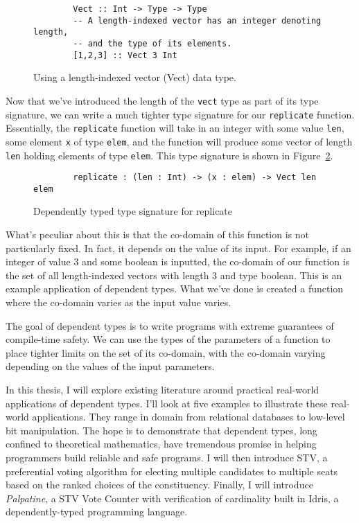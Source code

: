 \begin{figure}[ht!!!]
    \caption{Using a length-indexed vector (Vect) data type.}
    \label{vect}
    \begin{lstlisting}
        Vect :: Int -> Type -> Type 
        -- A length-indexed vector has an integer denoting length, 
        -- and the type of its elements. 
        [1,2,3] :: Vect 3 Int
    \end{lstlisting}
\end{figure} 


Now that we've introduced the length of the \texttt{vect} type as part of its
type signature, we can write a much tighter type signature for our
\texttt{replicate} function. Essentially, the \texttt{replicate} function will
take in an integer with some value \texttt{len}, some element \texttt{x} of type
\texttt{elem}, and the function will produce some vector of length \texttt{len}
holding elements of type \texttt{elem}. This type signature is shown in
Figure~\ref{dtvect}. 

\begin{figure}
    \caption{Dependently typed type signature for replicate}
    \label{dtvect}
    \begin{lstlisting}
        replicate : (len : Int) -> (x : elem) -> Vect len elem
    \end{lstlisting}
\end{figure} 

What's peculiar about this is that the co-domain of this function is not
particularly fixed. In fact, it depends on the value of its input. For example,
if an integer of value 3 and some boolean is inputted, the co-domain of our
function is the set of all length-indexed vectors with length 3 and type
boolean. This is an example application of dependent types. What we've done is
created a function where the co-domain varies as the input value varies. 

The goal of dependent types is to write programs with extreme guarantees of
compile-time safety. We can use the types of the parameters of a function to
place tighter limits on the set of its co-domain, with the co-domain varying
depending on the values of the input parameters. 

In this thesis, I will explore existing literature around practical real-world
applications of dependent types. I'll look at five examples to illustrate these
real-world applications. They range in domain from relational databases to
low-level bit manipulation. The hope is to demonstrate that dependent types,
long confined to theoretical mathematics, have tremendous promise in helping
programmers build reliable and safe programs. I will then introduce STV, a
preferential voting algorithm for electing multiple candidates to multiple seats
based on the ranked choices of the constituency. Finally, I will introduce
\textit{Palpatine}, a STV Vote Counter with verification of cardinality built in
Idris, a dependently-typed programming language. 